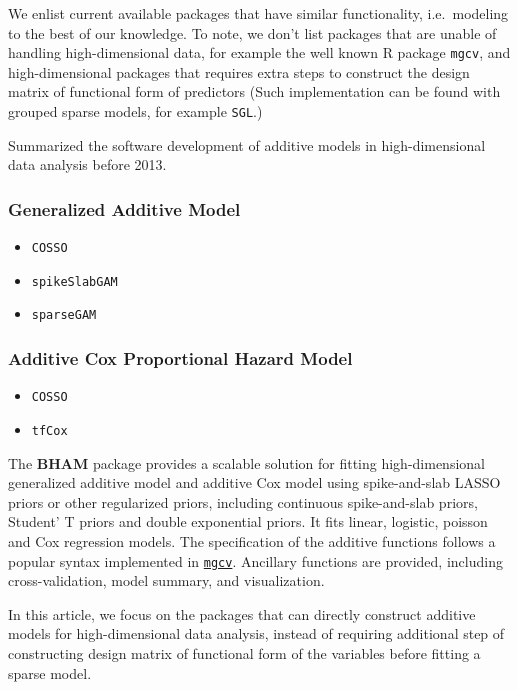 \documentclass[
]{jss}
\begin{document}
We enlist current available packages that have similar functionality,
i.e.~modeling to the best of our knowledge. To note, we don't list
packages that are unable of handling high-dimensional data, for example
the well known R package \texttt{mgcv}, and high-dimensional packages
that requires extra steps to construct the design matrix of functional
form of predictors (Such implementation can be found with grouped sparse
models, for example \texttt{SGL}.)

\cite{Scheipl2013} Summarized the software development of additive
models in high-dimensional data analysis before 2013.

\subsubsection{Generalized Additive Model}
\begin{itemize}
\item \texttt{COSSO}
\item \texttt{spikeSlabGAM}
\item \texttt{sparseGAM}
\end{itemize}

\subsubsection{Additive Cox Proportional Hazard Model}
\begin{itemize}
\item \texttt{COSSO}
\item \texttt{tfCox}
\end{itemize}

The \textbf{BHAM} package provides a scalable solution for fitting
high-dimensional generalized additive model and additive Cox model using
spike-and-slab LASSO priors or other regularized priors, including
continuous spike-and-slab priors, Student' T priors and double
exponential priors. It fits linear, logistic, poisson and Cox regression
models. The specification of the additive functions follows a popular
syntax implemented in
\href{https://cran.r-project.org/web/packages/mgcv/index.html}{\texttt{mgcv}}.
Ancillary functions are provided, including cross-validation, model
summary, and visualization.

In this article, we focus on the packages that can directly construct
additive models for high-dimensional data analysis, instead of requiring
additional step of constructing design matrix of functional form of the
variables before fitting a sparse model.
\end{document}
